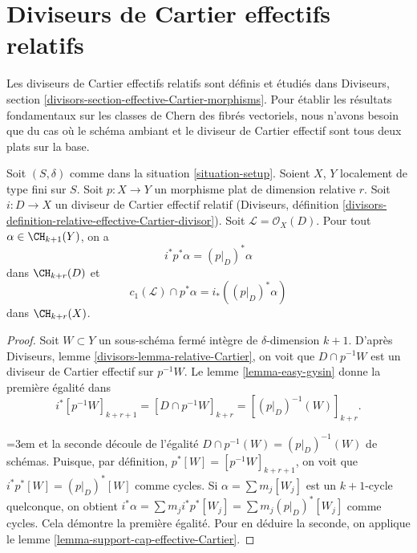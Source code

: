 \section{Diviseurs de Cartier effectifs relatifs}
\label{section-relative-effective-cartier}

\noindent
Les diviseurs de Cartier effectifs relatifs sont définis et étudiés
dans Diviseurs, section \ref{divisors-section-effective-Cartier-morphisms}.
Pour établir les résultats fondamentaux sur les classes de Chern des fibrés vectoriels,
nous n'avons besoin que du cas où le schéma ambiant et le diviseur de Cartier
effectif sont tous deux plats sur la base.

\begin{lemma}
\label{lemma-relative-effective-cartier}
Soit $(S, \delta)$ comme dans la situation \ref{situation-setup}.
Soient $X$, $Y$ localement de type fini sur $S$.
Soit $p : X \to Y$ un morphisme plat de dimension relative $r$.
Soit $i : D \to X$ un diviseur de Cartier effectif relatif
(Diviseurs, définition
\ref{divisors-definition-relative-effective-Cartier-divisor}).
Soit $\mathcal{L} = \mathcal{O}_X(D)$.
Pour tout $\alpha \in \CH_{k + 1}(Y)$, on a
$$
i^*p^*\alpha = (p|_D)^*\alpha
$$
dans $\CH_{k + r}(D)$ et
$$
c_1(\mathcal{L}) \cap p^*\alpha = i_* ((p|_D)^*\alpha)
$$
dans $\CH_{k + r}(X)$.
\end{lemma}

\begin{proof}
Soit $W \subset Y$ un sous-schéma fermé intègre de $\delta$-dimension
$k + 1$. D'après Diviseurs, lemme \ref{divisors-lemma-relative-Cartier},
on voit que $D \cap p^{-1}W$ est un diviseur de Cartier
effectif sur $p^{-1}W$. Le lemme \ref{lemma-easy-gysin}
donne la première égalité dans
$$
i^*[p^{-1}W]_{k + r + 1} =
[D \cap p^{-1}W]_{k + r} =
[(p|_D)^{-1}(W)]_{k + r}.
$$
{\emergencystretch=3em et la seconde découle de l'égalité $D \cap p^{-1}(W) = (p|_D)^{-1}(W)$ de schémas.
Puisque, par définition, $p^*[W] = [p^{-1}W]_{k + r + 1}$, on voit que
$i^*p^*[W] = (p|_D)^*[W]$ comme cycles. Si $\alpha = \sum m_j[W_j]$ est un
$k + 1$-cycle quelconque, on obtient
$i^*\alpha = \sum m_j i^*p^*[W_j] = \sum m_j(p|_D)^*[W_j]$ comme cycles.
Cela démontre la première égalité. Pour en déduire la seconde,
on applique le lemme \ref{lemma-support-cap-effective-Cartier}.\par}
\end{proof}








